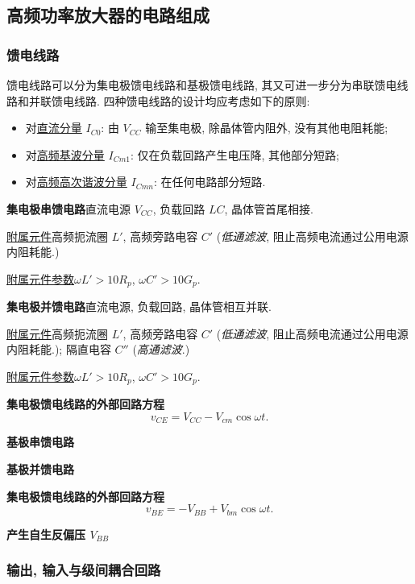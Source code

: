 \subsection{高频功率放大器的电路组成} \label{5 高频功率放大器的功率组成}
\subsubsection{馈电线路}
馈电线路可以分为集电极馈电线路和基极馈电线路, 其又可进一步分为串联馈电线路和并联馈电线路. 四种馈电线路的设计均应考虑如下的原则:
\begin{itemize}
    \item 对\underline{直流分量} $I_{C0}$: 由 $V_{CC}$ 输至集电极, 除晶体管内阻外, 没有其他电阻耗能;
    \item 对\underline{高频基波分量} $I_{Cm1}$: 仅在负载回路产生电压降, 其他部分短路;
    \item 对\underline{高频高次谐波分量} $I_{Cmn}$: 在任何电路部分短路.
\end{itemize}

\textbf{集电极串馈电路}\quad 直流电源 $V_{CC}$, 负载回路 $LC$, 晶体管首尾相接.

\underline{附属元件}\quad 高频扼流圈 $L'$, 高频旁路电容 $C'$ (\textit{低通滤波}, 阻止高频电流通过公用电源内阻耗能.)

\underline{附属元件参数}\quad $\omega L'>10R_p$, $\omega C'>10G_p$.

\textbf{集电极并馈电路}\quad 直流电源, 负载回路, 晶体管相互并联.

\underline{附属元件}\quad 高频扼流圈 $L'$, 高频旁路电容 $C'$ (\textit{低通滤波}, 阻止高频电流通过公用电源内阻耗能.); 隔直电容 $C''$ (\textit{高通滤波}.)

\underline{附属元件参数}\quad $\omega L'>10R_p$, $\omega C'>10G_p$.

\textbf{集电极馈电线路的外部回路方程}
\begin{equation}
    v_{CE}=V_{CC}-V_{cm}\cos\omega t.
\end{equation}

\textbf{基极串馈电路}

\textbf{基极并馈电路}

\textbf{集电极馈电线路的外部回路方程}
\begin{equation}
    v_{BE}=-V_{BB}+V_{bm}\cos\omega t.
\end{equation}

\textbf{产生自生反偏压 $V_{BB}$}

\subsubsection{输出, 输入与级间耦合回路}

